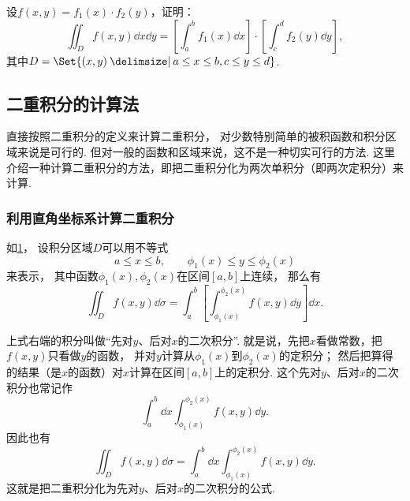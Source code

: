 \begin{example}
设\(f(x,y) = f_1(x) \cdot f_2(y)\)，证明：\[
\iint_D f(x,y) \dd{x} \dd{y}
= \left[ \int_a^b f_1(x) \dd{x} \right] \cdot \left[ \int_c^d f_2(y) \dd{y} \right],
\]其中\(D = \Set{(x,y) \given a \leq x \leq b, c \leq y \leq d}\).
\end{example}

\subsection{二重积分的计算法}
直接按照二重积分的定义来计算二重积分，
对少数特别简单的被积函数和积分区域来说是可行的.
但对一般的函数和区域来说，这不是一种切实可行的方法.
这里介绍一种计算二重积分的方法，即把二重积分化为两次单积分（即两次定积分）来计算.

\subsubsection{利用直角坐标系计算二重积分}
如\cref{figure:二重积分.X型区域}，
设积分区域\(D\)可以用不等式
\[
	a \leq x \leq b, \qquad
	\phi_1(x) \leq y \leq \phi_2(x)
\]来表示，
其中函数\(\phi_1(x),\phi_2(x)\)在区间\([a,b]\)上连续，
那么有\[
	\iint_D f(x,y) \dd{\sigma}
	= \int_a^b \left[ \int_{\phi_1(x)}^{\phi_2(x)} f(x,y) \dd{y} \right] \dd{x}.
\]

上式右端的积分叫做“先对\(y\)、后对\(x\)的二次积分”.
就是说，先把\(x\)看做常数，把\(f(x,y)\)只看做\(y\)的函数，
并对\(y\)计算从\(\phi_1(x)\)到\(\phi_2(x)\)的定积分；
然后把算得的结果（是\(x\)的函数）对\(x\)计算在区间\([a,b]\)上的定积分.
这个先对\(y\)、后对\(x\)的二次积分也常记作\[
	\int_a^b \dd{x} \int_{\phi_1(x)}^{\phi_2(x)} f(x,y) \dd{y}.
\]
因此也有\[
	\iint_D f(x,y) \dd{\sigma}
	= \int_a^b \dd{x} \int_{\phi_1(x)}^{\phi_2(x)} f(x,y) \dd{y}.
\]
这就是把二重积分化为先对\(y\)、后对\(x\)的二次积分的公式.

\begin{figure}[ht]
	\centering
	\caption{}
	\label{figure:二重积分.X型区域}
\end{figure}

